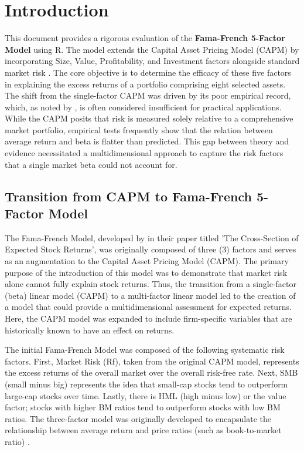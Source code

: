 \documentclass[12pt]{article}
\begin{document}
\newpage
\tableofcontents
\newpage





\section{Introduction}
This document provides a rigorous evaluation of the \textbf{Fama-French 5-Factor Model} using R. The model extends the Capital Asset Pricing Model (CAPM) by incorporating Size, Value, Profitability, and Investment factors alongside standard market risk \parencite{fama1993common, fama2015five}. The core objective is to determine the efficacy of these five factors in explaining the excess returns of a portfolio comprising eight selected assets.
The shift from the single-factor CAPM was driven by its poor empirical record, which, as noted by \textcite{fama2004capital}, is often considered insufficient for practical applications. While the CAPM posits that risk is measured solely relative to a comprehensive market portfolio, empirical tests frequently show that the relation between average return and beta is flatter than predicted. This gap between theory and evidence necessitated a multidimensional approach to capture the risk factors that a single market beta could not account for.

\subsection{Transition from CAPM to Fama-French 5-Factor Model}
The Fama-French Model, developed by \textcite{fama1992cross} in their paper titled 'The Cross-Section of Expected Stock Returns', was originally composed of three (3) factors and serves as an augmentation to the Capital Asset Pricing Model (CAPM). The primary purpose of the introduction of this model was to demonstrate that market risk alone cannot fully explain stock returns. Thus, the transition from a single-factor (beta) linear model (CAPM) to a multi-factor linear model led to the creation of a model that could provide a multidimensional assessment for expected returns. Here, the CAPM model was expanded to include firm-specific variables that are historically known to have an effect on returns.

The initial Fama-French Model was composed of the following systematic risk factors. First, Market Risk (Rf), taken from the original CAPM model, represents the excess returns of the overall market over the overall risk-free rate. Next, SMB (small minus big) represents the idea that small-cap stocks tend to outperform large-cap stocks over time. Lastly, there is HML (high minus low) or the value factor; stocks with higher BM ratios tend to outperform stocks with low BM ratios. The three-factor model was originally developed to encapsulate the relationship between average return and price ratios (such as book-to-market ratio) \parencite{fama1993common}.
\end{document}
